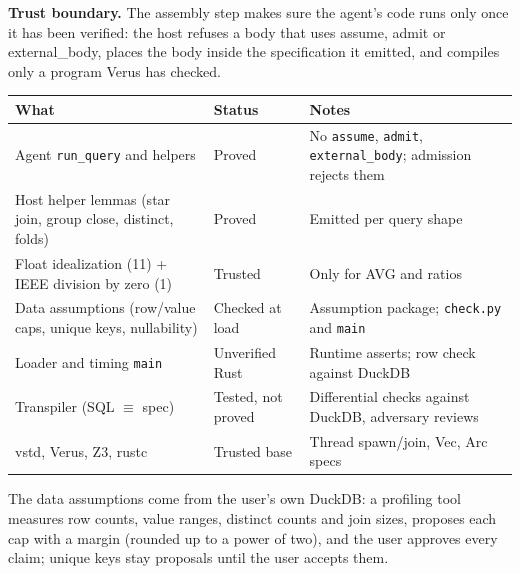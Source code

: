 \documentclass[
  10pt,
]{article}
\newcounter{none} %
\begin{document}
\textbf{Trust boundary.} The assembly step makes sure the agent's code
runs only once it has been verified: the host refuses a body that uses
assume, admit or external\_body, places the body inside the
specification it emitted, and compiles only a program Verus has checked.

{\def\LTcaptype{none} %
\begin{longtable}[]{@{}
  >{\raggedright\arraybackslash}p{}
  >{\raggedright\arraybackslash}p{}
  >{\raggedright\arraybackslash}p{}@{}}
\toprule\noalign{}
\begin{minipage}[b]{\linewidth}\raggedright
What
\end{minipage} & \begin{minipage}[b]{\linewidth}\raggedright
Status
\end{minipage} & \begin{minipage}[b]{\linewidth}\raggedright
Notes
\end{minipage} \\
\midrule\noalign{}
\endhead
\bottomrule\noalign{}
\endlastfoot
Agent \texttt{run\_query} and helpers & Proved & No \texttt{assume},
\texttt{admit}, \texttt{external\_body}; admission rejects them \\
Host helper lemmas (star join, group close, distinct, folds) & Proved &
Emitted per query shape \\
Float idealization (11) + IEEE division by zero (1) & Trusted & Only for
AVG and ratios \\
Data assumptions (row/value caps, unique keys, nullability) & Checked at
load & Assumption package; \texttt{check.py} and \texttt{main} \\
Loader and timing \texttt{main} & Unverified Rust & Runtime asserts; row
check against DuckDB \\
Transpiler (SQL \ensuremath{\equiv} spec) & Tested, not proved & Differential checks
against DuckDB, adversary reviews \\
vstd, Verus, Z3, rustc & Trusted base & Thread spawn/join, Vec, Arc
specs \\
\end{longtable}
}

The data assumptions come from the user's own DuckDB: a profiling tool
measures row counts, value ranges, distinct counts and join sizes,
proposes each cap with a margin (rounded up to a power of two), and the
user approves every claim; unique keys stay proposals until the user
accepts them.
\end{document}
